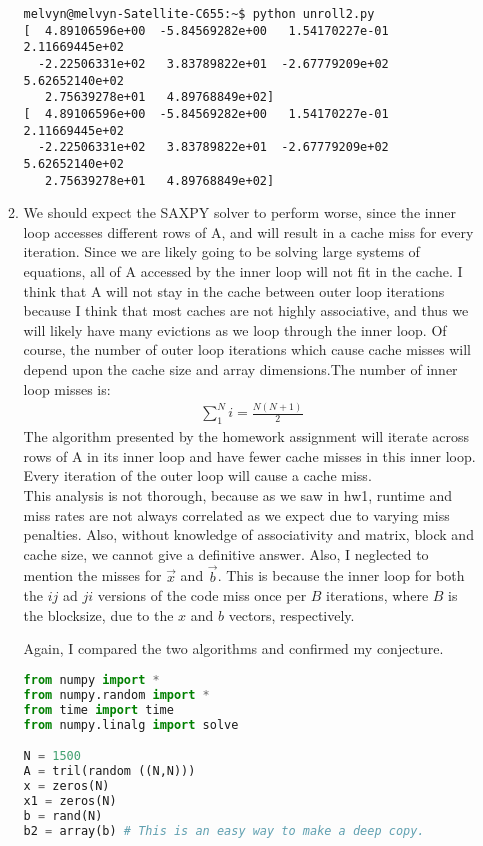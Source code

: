 \documentclass[11pt]{article}
\begin{document}
\begin{enumerate}
\begin{enumerate}
\begin{lstlisting}
melvyn@melvyn-Satellite-C655:~$ python unroll2.py
[  4.89106596e+00  -5.84569282e+00   1.54170227e-01   2.11669445e+02
  -2.22506331e+02   3.83789822e+01  -2.67779209e+02   5.62652140e+02
   2.75639278e+01   4.89768849e+02]
[  4.89106596e+00  -5.84569282e+00   1.54170227e-01   2.11669445e+02
  -2.22506331e+02   3.83789822e+01  -2.67779209e+02   5.62652140e+02
   2.75639278e+01   4.89768849e+02]
\end{lstlisting}
\item We should expect the SAXPY solver to perform worse, since the inner loop accesses different rows of A, and will result in a cache miss for every iteration. Since we are likely going to be solving large systems of equations, all of A accessed by the inner loop will not fit in the cache. I think that A  will not stay in the cache between outer loop iterations because I think that most caches are not highly associative, and thus we will likely have many evictions as we loop through the inner loop.  Of course, the number of outer loop iterations which cause cache misses will depend upon the cache size and array dimensions.The number of inner loop misses is:\\
\begin{gather*}
\sum_1^Ni = \frac{N(N+1)}{2} 
\end{gather*}
The algorithm presented by the homework assignment will iterate across rows of A in its inner loop and have fewer cache misses in this inner loop. Every iteration of the outer loop will cause a cache miss. \\
This analysis is not thorough, because as we saw in hw1, runtime and miss rates are not always correlated as we expect due to varying miss penalties. Also, without knowledge of associativity and matrix, block and cache size, we cannot give a definitive answer. Also, I neglected to mention the misses for $\vec{x}$ and $\vec{b}$. This is because the inner loop for both the $ij$ ad $ji$ versions of the code miss once per $B$ iterations, where $B$ is the blocksize, due to the $x$ and $b$ vectors, respectively. 

Again, I compared the two algorithms and confirmed my conjecture.
\begin{lstlisting}[language=Python]
from numpy import *
from numpy.random import *
from time import time
from numpy.linalg import solve

N = 1500
A = tril(random ((N,N)))
x = zeros(N)
x1 = zeros(N)
b = rand(N)
b2 = array(b) # This is an easy way to make a deep copy.


\end{lstlisting}
\end{enumerate}
\end{enumerate}
\end{document}
